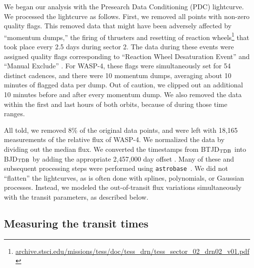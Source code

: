 \documentclass[12pt,twocolumn,tighten]{aastex62}
\begin{document}
{We began our analysis with the Presearch Data Conditioning (PDC)
lightcurve.  We  processed the
lightcurve as follows.  First, we removed all points with non-zero
quality flags.  This removed data that might have been adversely
affected by ``momentum dumps,'' the firing of thrusters and resetting
of reaction wheels\footnote{\url{archive.stsci.edu/missions/tess/doc/tess_drn/tess_sector_02_drn02_v01.pdf}}
that took place every 2.5 days during sector 2.  The data during these
events were assigned quality flags corresponding to ``Reaction Wheel
Desaturation Event'' and ``Manual Exclude'' .  For WASP-4, these flags
were simultaneously set for 54 distinct cadences, and there were 10
momentum dumps, averaging about 10 minutes of flagged data per dump.
Out of caution, we clipped out an additional 10 minutes before and
after every momentum dump.  We also removed the data within the first
and last hours of both orbits, because of 
during those time ranges. 

All told, we removed 8\% of the original data points, and were left
with 18{,}165 measurements of the relative flux of WASP-4.  We
normalized the data by dividing out the median flux.  We converted the
timestamps from BTJD$_{\rm TDB}$ into BJD$_{\rm TDB}$ by adding the
appropriate 2{,}457{,}000 day offset
\citep{tess_data_product_description_2018}.  Many of these and
subsequent processing steps were performed using
\texttt{astrobase}~\citep{bhatti_astrobase_2018}. We did not
``flatten'' the lightcurves, as is often done with splines,
polynomials, or Gaussian processes.  Instead, we modeled the
out-of-transit flux variations simultaneously with the transit
parameters, as described below.

\subsection{Measuring the transit times}
\label{sec:measurement}

}
\end{document}
